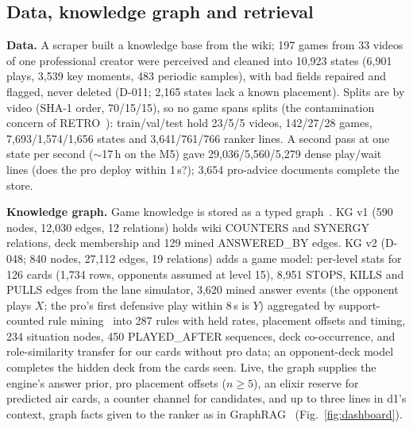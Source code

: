 \subsection{Data, knowledge graph and retrieval}
\textbf{Data.} A scraper built a knowledge base from the wiki; 197 games from 33 videos of one professional creator were perceived and cleaned into 10,923 states (6,901 plays, 3,539 key moments, 483 periodic samples), with bad fields repaired and flagged, never deleted (D-011; 2,165 states lack a known placement). %
Splits are by video (SHA-1 order, 70/15/15), so no game spans splits (the contamination concern of RETRO~\cite{borgeaud2022retro}): train/val/test hold 23/5/5 videos, 142/27/28 games, 7,693/1,574/1,656 states and 3,641/761/766 ranker lines. A second pass at one state per second ($\sim$17\,h on the M5) gave 29,036/5,560/5,279 dense play/wait lines (does the pro deploy within 1\,s?); 3,654 pro-advice documents complete the store. %

\textbf{Knowledge graph.} Game knowledge is stored as a typed graph~\cite{cap6938L05}. KG v1 (590 nodes, 12,030 edges, 12 relations) holds wiki COUNTERS and SYNERGY relations, deck membership and 129 mined ANSWERED\_BY edges. KG v2 (D-048; 840 nodes, 27,112 edges, 19 relations) adds a game model: per-level stats for 126 cards (1,734 rows, opponents assumed at level 15), 8,951 STOPS, KILLS and PULLS edges from the lane simulator, 3,620 mined answer events (the opponent plays $X$; the pro's first defensive play within 8\,s is $Y$) aggregated by support-counted rule mining~\cite{lajus2020amie3,liu2022tlogic} into 287 rules with held rates, placement offsets and timing, 234 situation nodes, 450 PLAYED\_AFTER sequences, deck co-occurrence, and role-similarity transfer for our cards without pro data; an opponent-deck model completes the hidden deck from the cards seen. %
Live, the graph supplies the engine's answer prior, pro placement offsets ($n\ge5$), an elixir reserve for predicted air cards, a counter channel for candidates, and up to three  lines in d1's context, graph facts given to the ranker as in GraphRAG~\cite{edge2024graphrag,lim2026l12} (Fig.~\ref{fig:dashboard}). %


